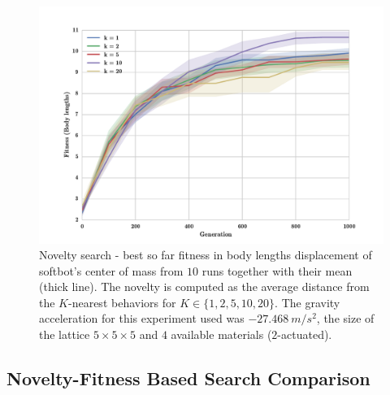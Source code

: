 \begin{figure}
\centering
\includegraphics[width=1.0\textwidth]{Figures/Results/KnnExperimentSize5.pdf}
\caption{Novelty search - best so far fitness in body lengths displacement of softbot's center of mass from $10$ runs together with their mean (thick line). The novelty is computed as the average distance from the $K$-nearest behaviors for $K \in \lbrace 1,2,5,10,20 \rbrace $. The gravity acceleration for this experiment used was $-27.468\   m/s^2$, the size of the lattice $5\times 5\times5$ and $4$ available materials ($2$-actuated).}
\label{fig:KnnExperimentSize5}
\end{figure}


















\clearpage
\subsection{Novelty-Fitness Based Search Comparison}

